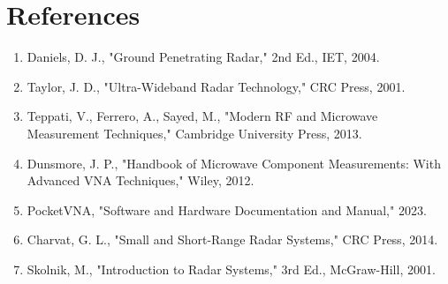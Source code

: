 \documentclass[11pt,a4paper]{article}
\begin{document}
\section{References}

\begin{enumerate}
    \item Daniels, D. J., "Ground Penetrating Radar," 2nd Ed., IET, 2004.
    \item Taylor, J. D., "Ultra-Wideband Radar Technology," CRC Press, 2001.
    \item Teppati, V., Ferrero, A., Sayed, M., "Modern RF and Microwave Measurement Techniques," Cambridge University Press, 2013.
    \item Dunsmore, J. P., "Handbook of Microwave Component Measurements: With Advanced VNA Techniques," Wiley, 2012.
    \item PocketVNA, "Software and Hardware Documentation and Manual," 2023.
    \item Charvat, G. L., "Small and Short-Range Radar Systems," CRC Press, 2014.
    \item Skolnik, M., "Introduction to Radar Systems," 3rd Ed., McGraw-Hill, 2001.
\end{enumerate}
\end{document}
